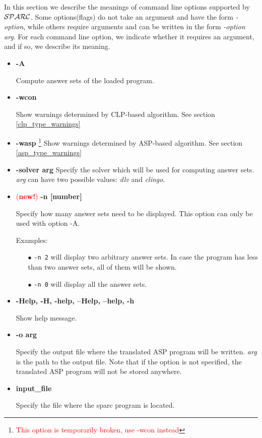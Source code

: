 \documentclass[12pt, letterpaper]{article}
\begin{document}
In this section we  describe the meanings of command line options supported by
${\cal SPARC}$. Some options(flags) do not take an argument and have the form \textit{-option},
while others require arguments and can be written in the form \textit{-option arg}.
For each command line option, we indicate whether it requires
an argument, and if so, we  describe its meaning.

\begin{itemize}
 \item \textbf{-A}
    
  Compute answer sets of the loaded program.

\item \textbf{-wcon}
    
  Show warnings determined by CLP-based algorithm. See section \ref{clp_type_warnings}

\item \textbf{-wasp} 
  \footnote{\textcolor{red}{This option is temporarily broken, use -wcon instead}}
  Show warnings determined by ASP-based algorithm. See section \ref{asp_type_warnings}

\item \textbf{-solver arg}
  Specify the solver which will be used for computing answer sets. \textit{arg} can have two possible values: \textit{dlv} and \textit{clingo}. 
\item \textcolor{red}{(\textbf{new!})} \textbf{-n [number]}

  Specify how many answer sets need to be displayed. This option can only be used with option -A.
  
  Examples:
  \begin{itemize}
  \item[$\bullet$] \texttt{-n 2} will display two arbitrary answer sets. In case the program has less than two answer sets, all of them will be shown.
  \item[$\bullet$] \texttt{-n 0} will display all the answer sets.
    \end{itemize}


\item \textbf{-Help, -H, -help, --Help, --help, -h}

  Show help message.

\item \textbf{-o arg}

  Specify the output file where the translated ASP program will be written. \textit{arg} is the path to the output file. 
  Note that if the option is not specified, the translated ASP program will not be stored anywhere.

\item \textbf{input\_file}
  
Specify the file where the sparc program is located.



\end{itemize}
\end{document}
